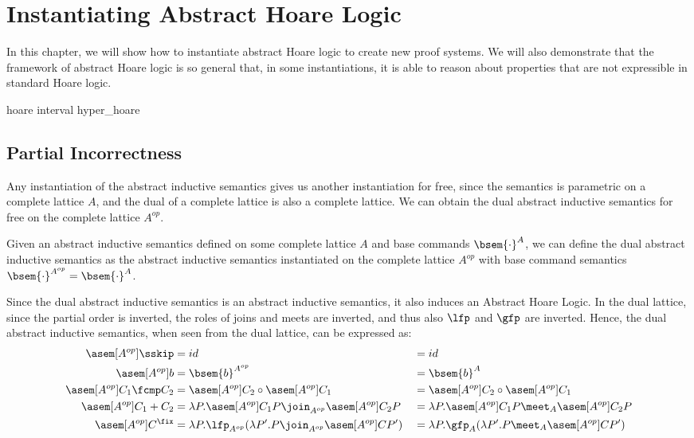 \chapter{Instantiating Abstract Hoare Logic}

In this chapter, we will show how to instantiate abstract Hoare logic to create 
new proof systems. We will also demonstrate that the framework of abstract Hoare 
logic is so general that, in some instantiations, it is able to reason about 
properties that are not expressible in standard Hoare logic.

{hoare}
{interval}
{hyper_hoare}

\section{Partial Incorrectness}
\label{chp:partial-incorrectness}

Any instantiation of the abstract inductive semantics gives us another
instantiation for free, since the semantics is parametric on a complete lattice
$A$, and the dual of a complete lattice is also a complete lattice. We can
obtain the dual abstract inductive semantics for free on the complete lattice
$A^{op}$.

\begin{definition}
  Given an abstract inductive semantics defined on some complete lattice $A$
  and base commands $\bsem{\cdot}^A$, we can define the dual abstract inductive
  semantics as the abstract inductive semantics instantiated on the 
  complete lattice $A^{op}$ with base command semantics $\bsem{\cdot}^{A^{op}}
  = \bsem{\cdot}^A$.
\end{definition}

Since the dual abstract inductive semantics is an abstract inductive semantics,
it also induces an Abstract Hoare Logic. In the dual lattice, since the partial
order is inverted, the roles of joins and meets are inverted, and thus also
$\lfp$ and $\gfp$ are inverted. Hence, the dual abstract inductive semantics,
when seen from the dual lattice, can be expressed as: 
\begin{align*}
  \asem[A^{op}]{\sskip}        &= id &&= id \\
  \asem[A^{op}]{b}             &= \bsem{b}^{A^{op}} &&= \bsem{b}^A \\
  \asem[A^{op}]{C_1 \fcmp C_2} &= \asem[A^{op}]{C_2} \circ \asem[A^{op}]{C_1} &&= \asem[A^{op}]{C_2} \circ \asem[A^{op}]{C_1} \\
  \asem[A^{op}]{C_1 + C_2}     &= \lambda P . \asem[A^{op}]{C_1} P \join_{A^{op}} \asem[A^{op}]{C_2} P &&= \lambda P . \asem[A^{op}]{C_1} P \meet_A \asem[A^{op}]{C_2} P \\
  \asem[A^{op}]{C^\fix}        &= \lambda P . \lfp_{A^{op}}(\lambda P'. P \join_{A^{op}} \asem[A^{op}]{C} P') &&= \lambda P . \gfp_{A}(\lambda P'. P \meet_A \asem[A^{op}]{C} P')
\end{align*}

